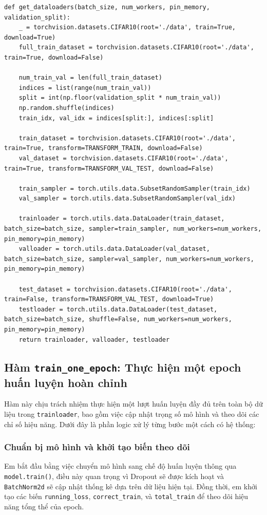 \documentclass[12pt, a4paper, openany]{report}
\begin{document}
\begin{verbatim}
def get_dataloaders(batch_size, num_workers, pin_memory, validation_split):
    _ = torchvision.datasets.CIFAR10(root='./data', train=True, download=True)
    full_train_dataset = torchvision.datasets.CIFAR10(root='./data', train=True, download=False)

    num_train_val = len(full_train_dataset)
    indices = list(range(num_train_val))
    split = int(np.floor(validation_split * num_train_val))
    np.random.shuffle(indices)
    train_idx, val_idx = indices[split:], indices[:split]

    train_dataset = torchvision.datasets.CIFAR10(root='./data', train=True, transform=TRANSFORM_TRAIN, download=False)
    val_dataset = torchvision.datasets.CIFAR10(root='./data', train=True, transform=TRANSFORM_VAL_TEST, download=False)

    train_sampler = torch.utils.data.SubsetRandomSampler(train_idx)
    val_sampler = torch.utils.data.SubsetRandomSampler(val_idx)

    trainloader = torch.utils.data.DataLoader(train_dataset, batch_size=batch_size, sampler=train_sampler, num_workers=num_workers, pin_memory=pin_memory)
    valloader = torch.utils.data.DataLoader(val_dataset, batch_size=batch_size, sampler=val_sampler, num_workers=num_workers, pin_memory=pin_memory)

    test_dataset = torchvision.datasets.CIFAR10(root='./data', train=False, transform=TRANSFORM_VAL_TEST, download=True)
    testloader = torch.utils.data.DataLoader(test_dataset, batch_size=batch_size, shuffle=False, num_workers=num_workers, pin_memory=pin_memory)
    return trainloader, valloader, testloader
\end{verbatim}

\subsection{Hàm \texttt{train\_one\_epoch}: Thực hiện một epoch huấn luyện hoàn chỉnh}
Hàm này chịu trách nhiệm thực hiện một lượt huấn luyện đầy đủ trên toàn bộ dữ liệu trong \texttt{trainloader}, bao gồm việc cập nhật trọng số mô hình và theo dõi các chỉ số hiệu năng. Dưới đây là phần logic xử lý từng bước một cách có hệ thống:

\subsubsection*{Chuẩn bị mô hình và khởi tạo biến theo dõi}
Em bắt đầu bằng việc chuyển mô hình sang chế độ huấn luyện thông qua \texttt{model.train()}, điều này quan trọng vì Dropout sẽ được kích hoạt và \texttt{BatchNorm2d} sẽ cập nhật thống kê dựa trên dữ liệu hiện tại. Đồng thời, em khởi tạo các biến \texttt{running\_loss}, \texttt{correct\_train}, và \texttt{total\_train} để theo dõi hiệu năng tổng thể của epoch.
\end{document}
